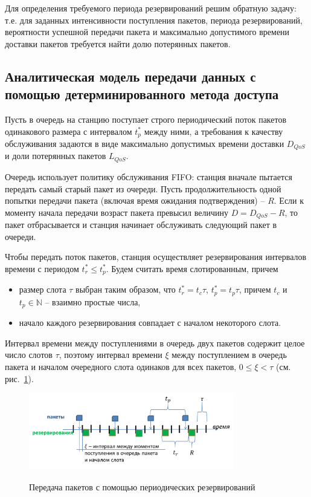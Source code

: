 Для определения требуемого периода резервирований решим обратную задачу: т.е. для заданных интенсивности поступления пакетов, периода резервирований,  вероятности успешной передачи пакета и максимально допустимого времени доставки пакетов требуется найти  долю потерянных пакетов.

\subsection{Аналитическая модель передачи данных с помощью детерминированного метода доступа}
Пусть в очередь на станцию поступает строго периодический поток пакетов одинакового размера с интервалом $t_p^*$ между ними, а требования к качеству обслуживания задаются в виде максимально допустимых времени доставки $D_{QoS}$ и доли потерянных пакетов $L_{QoS}$.

Очередь использует политику обслуживания FIFO: станция вначале пытается передать самый старый пакет из очереди. Пусть продолжительность одной попытки передачи пакета (включая время ожидания подтверждения) -- $R$. Если к моменту начала передачи возраст пакета превысил величину $D = D_{QoS} - R$, то пакет отбрасывается и станция начинает обслуживать следующий пакет в очереди.

Чтобы передать поток пакетов, станция осуществляет резервирования интервалов времени с периодом $t_r^* \leq t_p^*$. Будем считать время слотированным, причем
\begin{itemize}
  \item размер слота $\tau$ выбран таким образом, что $t_r^*  = t_c \tau $,  $t_p^* = t_p \tau$, причем $t_c$ и $t_p \in \mathbb{N}$ -- взаимно простые числа,
  \item начало каждого резервирования совпадает с началом некоторого слота.
\end{itemize}

Интервал времени между поступлениями в очередь двух пакетов содержит целое число слотов $\tau$, поэтому интервал времени $\xi$ между поступлением в очередь пакета и началом очередного слота одинаков для всех пакетов, $0 \leq \xi < \tau$ (см. рис.~\ref{fig:mcca:an:send}).

\begin{figure}
\centering
     \includegraphics[width=0.8\textwidth]{pic/reserv.png} \\
    \caption{\label{fig:mcca:an:send} Передача пакетов с помощью периодических резервирований}
\end{figure}

